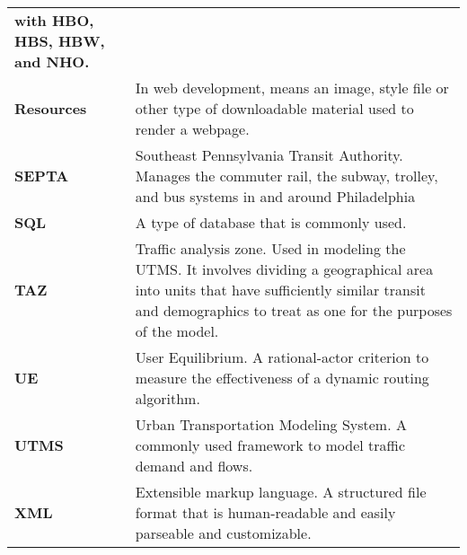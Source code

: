 {\begin{tabular}{%
    >{\raggedright\bfseries}p{}%
    p{\midcolumnwidth}}
  with HBO, HBS, HBW, and NHO. \\
  Resources & In web development, means an image, style file or other
  type of downloadable material used to render a webpage. \\
  SEPTA & Southeast Pennsylvania Transit Authority. Manages the
  commuter rail, the subway, trolley, and bus systems in and around
  Philadelphia \\
  SQL & A type of database that is commonly used. \\
  TAZ & Traffic analysis zone. Used in modeling the UTMS. It involves
  dividing a geographical area into units that have sufficiently
  similar transit and demographics to treat as one for the purposes of
  the model. \\
  UE & User Equilibrium. A rational-actor criterion to measure the
  effectiveness of a dynamic routing algorithm. \\
  UTMS & Urban Transportation Modeling System. A commonly used
  framework to model traffic demand and flows. \\
  XML & Extensible markup language. A structured file format that is
  human-readable and easily parseable and customizable. \\
\end{tabular}
}